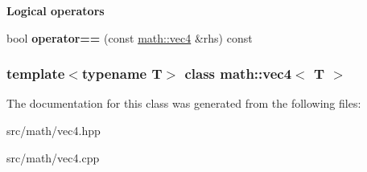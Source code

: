 \begin{Indent}{\bf Logical operators}\par
{\em \label{_amgrp9d91ba2818309585f03920f1efa28392}
 }\begin{DoxyCompactItemize}
\item 
\hypertarget{classmath_1_1vec4_a41d4486f6bcd339c38d31f300f5315c4}{
bool {\bfseries operator==} (const \hyperlink{classmath_1_1vec4}{math::vec4} \&rhs) const }
\label{classmath_1_1vec4_a41d4486f6bcd339c38d31f300f5315c4}

\end{DoxyCompactItemize}
\end{Indent}
\subsubsection*{template$<$typename T$>$ class math::vec4$<$ T $>$}



The documentation for this class was generated from the following files:\begin{DoxyCompactItemize}
\item 
src/math/vec4.hpp\item 
src/math/vec4.cpp\end{DoxyCompactItemize}
